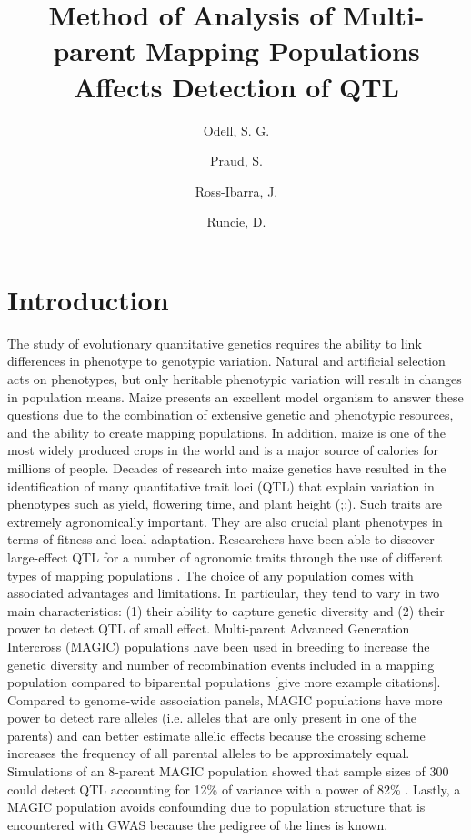 \documentclass[article,9pt,twocolumn,twoside]{rilabRxiv}
\title{Method of Analysis of Multi-parent Mapping Populations Affects Detection of QTL}
\author[$\ast$,1]{Odell, S. G.}
\author[$\dagger$]{Praud, S.}
\author[$\ast$,$\ddagger$]{Ross-Ibarra, J.}
\author[$\ast$,$\ddagger$]{Runcie, D.}
\affil[$\ast$]{Dept. of Plant Sciences and Center for Population Biology, University of California, Davis, CA, USA}
\affil[$\dagger$]{Limagrain, Chappes, France}
\affil[$\ddagger$]{Genome Center, University of California, Davis, CA, USA}
\begin{document}
\maketitle
\thispagestyle{firststyle}
{}
\vspace{-11pt}%

\section{Introduction}
The study of evolutionary quantitative genetics requires the ability to link differences in phenotype to genotypic variation. Natural and artificial selection acts on phenotypes, but only heritable phenotypic variation will result in changes in population means. Maize presents an excellent model organism to answer these questions due to the combination of extensive genetic and phenotypic resources, and the ability to create mapping populations. In addition, maize is one of the most widely produced crops in the world and is a major source of calories for millions of people. Decades of research into maize genetics have resulted in the identification of many quantitative trait loci (QTL) that explain variation in phenotypes such as yield, flowering time, and plant height (\citep{RN40};\citep{RN42};\citep{RN85}). Such traits are extremely agronomically important. They are also crucial plant phenotypes in terms of fitness and local adaptation.
Researchers have been able to discover large-effect QTL for a number of agronomic traits through the use of different types of mapping populations \citep{RN93}. The choice of any population comes with associated advantages and limitations. In particular, they tend to vary in two main characteristics: (1) their ability to capture genetic diversity and (2) their power to detect QTL of small effect. Multi-parent Advanced Generation Intercross (MAGIC) populations have been used in breeding to increase the genetic diversity and number of recombination events included in a mapping population compared to biparental populations \citep{RN8}[give more example citations]. Compared to genome-wide association panels, MAGIC populations have more power to detect rare alleles (i.e. alleles that are only present in one of the parents) and can better estimate allelic effects because the crossing scheme increases the frequency of all parental alleles to be approximately equal. Simulations of an 8-parent MAGIC population showed that sample sizes of 300 could detect QTL accounting for 12\% of variance with a power of 82\% \citep{RN65}. Lastly, a MAGIC population avoids confounding due to population structure that is encountered with GWAS because the pedigree of the lines is known.
\end{document}
